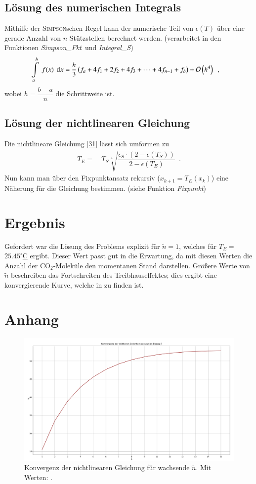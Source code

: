 \documentclass[12pt,a4paper,titlepage]{scrreprt}
\begin{document}
	\subsection{Lösung des numerischen Integrals}
	Mithilfe der \textsc{Simpson}schen Regel kann der numerische Teil von $\epsilon(T)$ über eine gerade Anzahl von $n$ Stützstellen berechnet werden.
	(verarbeitet in den Funktionen\textit{ \glqq Simpson\_Fkt\grqq}~und \textit{\glqq Integral\_S\grqq})
	\begin{align}
		\int\limits_a^b~f(x)~\dif x =&~\dfrac{h}{3}\left(f_a+4f_1+2f_2+4f_3+\dots+4f_{n-1}+f_b\right)+\mathcal{O}\left(h^4\right)~~,
	\end{align}
	wobei $h=\dfrac{b-a}{n}$ die Schrittweite ist.
	
	\subsection{Lösung der nichtlinearen Gleichung}
	Die nichtlineare Gleichung \eqref{31} lässt sich umformen zu
	\begin{align}
		T_E=&~T_S\sqrt[4]{\dfrac{\epsilon_S\cdot\left(2-\epsilon\left(T_S\right)\right)}{2-\epsilon\left(T_E\right)}}~~.
	\end{align}
	Nun kann man über den Fixpunktansatz rekursiv ($x_{k+1}=T_E(x_k)$)  eine Näherung für die Gleichung bestimmen. (siehe Funktion \textit{\glqq Fixpunkt\grqq})
		

	\section{Ergebnis}
	Gefordert war die Lösung des Problems explizit für $\tilde{n}=1$, welches für  $T_E=$\underline{$25.45^\circ$C} ergibt. Dieser Wert passt gut in die Erwartung, da mit diesen Werten die Anzahl der CO$_2$-Moleküle den momentanen Stand darstellen. Größere Werte von $\tilde{n}$ beschreiben das Fortschreiten des Treibhauseffektes; dies ergibt eine konvergierende Kurve, welche in  zu finden ist.

	
	\section{Anhang}
	\begin{figure}[H]
		\flushleft
		\includegraphics[width=1\textwidth]{Konvergenz}
		\caption{Konvergenz der nichtlinearen Gleichung für wachsende $\tilde{n}$. Mit Werten: .}
		\label{B1}
	\end{figure}
\end{document}

